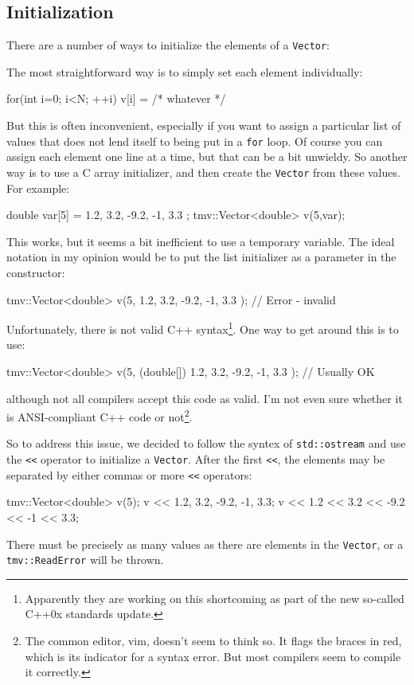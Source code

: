 \documentclass[twoside,letterpaper,11pt]{article}
\renewcommand{\tt}[1]{{\lstinline {#1}}}
\begin{document}
\subsection{Initialization}

There are a number of ways to initialize the elements of a \tt{Vector}:

The most straightforward way is to simply set each element individually:
\begin{tmvcode}
for(int i=0; i<N; ++i) {
    v[i] = /* whatever */
}
\end{tmvcode}

But this is often inconvenient, especially if you want to assign a particular list of 
values that does not lend itself to being put in a \tt{for} loop.  Of course you can assign
each element one line at a time, but that can be a bit unwieldy.  So another 
way is to use a C array initializer, and then create the \tt{Vector} from these values.  For example:
\begin{tmvcode}
double var[5] = { 1.2, 3.2, -9.2, -1, 3.3 };
tmv::Vector<double> v(5,var);
\end{tmvcode}
This works, but it seems a bit inefficient to use a temporary variable.  The ideal notation
in my opinion would be to put the list initializer as a parameter in the constructor:
\begin{tmvcode}
tmv::Vector<double> v(5, 
    { 1.2, 3.2, -9.2, -1, 3.3 }); // Error - invalid
\end{tmvcode}
Unfortunately, there is not valid C++ syntax\footnote{
Apparently they are working on this shortcoming as part of the new so-called C++0x 
standards update.}.
One way to get around this is to use:
\begin{tmvcode}
tmv::Vector<double> v(5, 
    (double[]) { 1.2, 3.2, -9.2, -1, 3.3 }); // Usually OK
\end{tmvcode}
although not all compilers accept this code as valid.  I'm not even sure whether
it is ANSI-compliant C++ code or not\footnote{
The common editor, vim, doesn't seem to think so.  
It flags the braces in red, which is its indicator for a syntax error.  But most compilers
seem to compile it correctly.}.

So to address this issue, we decided to follow the syntex of \tt{std::ostream}
and use the \tt{<<} operator to initialize a \tt{Vector}.  After the first 
\tt{<<}, the elements may be separated by either commas or more \tt{<<}
operators:
\begin{tmvcode}
tmv::Vector<double> v(5);
v << 1.2, 3.2, -9.2, -1, 3.3;
v << 1.2 << 3.2 << -9.2 << -1 << 3.3;
\end{tmvcode}
There must be precisely as many values as there are elements in the \tt{Vector},
or a \tt{tmv::ReadError} will be thrown.
\end{document}
